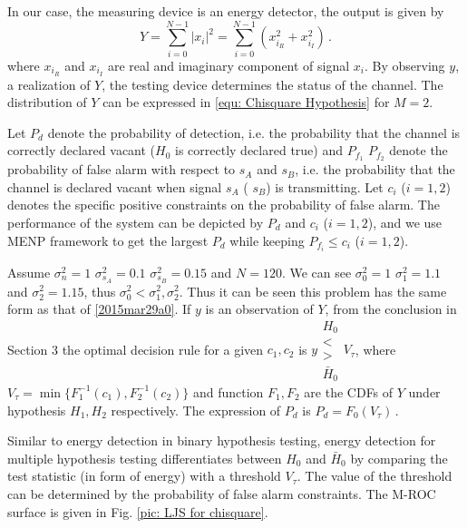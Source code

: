 In our case, the measuring device is an energy detector, the output is given by
\begin{equation} 
  Y = \sum_{i=0}^{N-1}|x_i|^2 = \sum_{i=0}^{N-1}(x_{i_R}^2+x_{i_I}^2)\,.
  \label{equ: testing device}
\end{equation}
where $x_{i_R}$ and $x_{i_I}$ are real and imaginary component of signal $x_i$.
By observing $y$, a realization of $Y$, the testing device determines the status of the channel. 
The distribution of $Y$ can be expressed in \eqref{equ: Chisquare Hypothesis} for $M = 2$. 

Let $P_d$ denote the probability of detection, i.e. the probability that the channel is correctly declared vacant ($H_0$ is correctly declared true) and $P_{f_1}$ $P_{f_2}$ denote the probability of false alarm with respect to $s_A$  and $s_B$, i.e. the probability that the channel is declared vacant when signal $s_A$ ( $s_B$) is transmitting. Let $c_i$ ($i = 1, 2$) denotes the specific positive constraints on the probability of false alarm. The performance of the system can be depicted by $P_d$ and $c_i$ ($i = 1, 2$), and we use MENP framework to get the largest $P_d$ while keeping $P_{f_i  } \leq c_i$ ($i=1, 2$).

Assume $\sigma_n^2=1$ $\sigma_{s_A}^2=0.1$ $\sigma_{s_B}^2=0.15$ and $N=120$. We can see $\sigma_0^2=1$ $\sigma_1^2=1.1$ and $\sigma_2^2=1.15$, 
thus $\sigma_0^2 < \sigma_1^2, \sigma_2^2$. 
Thus it can be seen this problem has the same form as that of \eqref{2015mar29a0}.  If $y$ is an observation of $Y$, 
from the conclusion in Section 3 the optimal  decision rule for a given $c_1, c_2$ is 
  $y \substack{H_0 \\ < \\ > \\ \bar{H}_0} V_\tau$, 
where $V_\tau = \min\{F_1^{-1}(c_1),  F_2^{-1}(c_2)\}$ and function $F_1,  F_2$ are the CDFs of $Y$ under hypothesis $H_1, H_2$ respectively. The expression of $P_d$ is 
$  P_d = F_0(V_\tau)\,.$

Similar to energy detection in binary hypothesis testing, energy detection for multiple hypothesis testing differentiates between $H_0$ and $\bar{H}_0$ by comparing the test statistic (in form of energy) with a threshold $V_\tau$. The value of the threshold can be determined by the probability of false alarm constraints.  The M-ROC surface is given in Fig. \ref{pic: LJS for chisquare}. 




